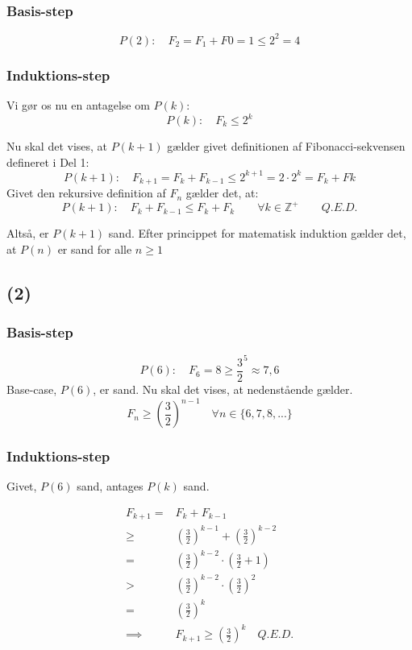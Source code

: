 \documentclass[a4paper,10pt]{article}
\begin{document}
\subsubsection*{Basis-step}
$$
P(2): \quad F_{2} = F_{1} + F{0} = 1 \leq 2^{2} = 4
$$
\subsubsection*{Induktions-step}
Vi gør os nu en antagelse om $P(k)$:
$$
P(k): \quad F_{k} \leq 2^{k}
$$

Nu skal det vises, at $P(k+1)$ gælder givet definitionen af Fibonacci-sekvensen defineret i Del 1:
$$
P(k+1): \quad F_{k+1} = F_{k} + F_{k-1} \leq 2^{k+1} = 2 \cdot 2^{k} = F_{k} + F{k}
$$
Givet den rekursive definition af $F_{n}$ gælder det, at:
$$
P(k+1): \quad F_{k} + F_{k-1} \leq F_{k} + F_{k}
\quad \quad \forall k \in \mathbb Z^{+} \quad \quad Q.E.D.
$$

Altså, er $P(k+1)$ sand. Efter princippet for matematisk induktion gælder det, at $P(n)$ er sand for alle $n \geq 1$

\subsection*{(2)}
\subsubsection*{Basis-step}
$$
P(6): \quad F_{6} = 8 \geq \frac{3}{2}^{5} \approx 7,6
$$
Base-case, $P(6)$, er sand. Nu skal det vises, at nedenstående gælder. 
$$
F_{n} \geq (\frac{3}{2})^{n-1} \quad \forall n \in \{6, 7, 8,...\}
$$

\subsubsection*{Induktions-step}
Givet, $P(6)$ sand, antages $P(k)$ sand. 

\begin{equation}
\begin{aligned}	
F_{k+1}	 	= 		& F_{k} + F_{k-1} \\
			\geq	& (\frac{3}{2})^{k-1} + (\frac{3}{2})^{k-2} \\
			=		& (\frac{3}{2})^{k-2} \cdot (\frac{3}{2} + 1) \\
			>		& (\frac{3}{2})^{k-2} \cdot (\frac{3}{2})^{2} \\
			=		& (\frac{3}{2})^{k} \\
			\implies & F_{k+1} \geq (\frac{3}{2})^{k} \quad Q.E.D.
\end{aligned}
\end{equation}
\end{document}
